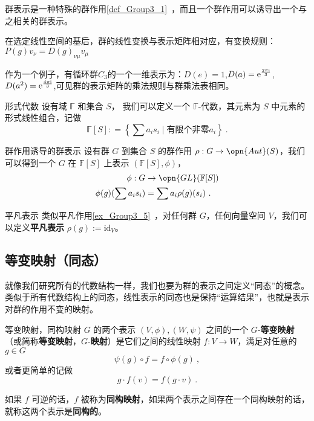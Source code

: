 群表示是一种特殊的群作用\autoref{def_Group3_1}~，而且一个群作用可以诱导出一个与之相关的群表示。

在选定线性空间的基后，群的线性变换与表示矩阵相对应，有变换规则：$P(g)v_\nu=D(g)_{\nu\mu}v_\mu$

作为一个例子，有循环群$C_3$的一个一维表示为：$D(e)=1$,$D(a)=\rm{e}^{\frac{2\pi i}{3}}$,$D(a^2)=\rm{e}^{\frac{4\pi i}{3}}$,可见群的表示矩阵的乘法规则与群乘法表相同。


\begin{definition}{形式代数}
设有域 $\mathbb{F}$ 和集合 $S$， 我们可以定义一个 $\mathbb{F}$-代数，其元素为 $S$ 中元素的形式线性组合，记做
$$
\mathbb{F}[S]: = \left\{ \sum a_i s_i \mid \text{有限个非零} a_i \right\}~.
$$
\end{definition}

\begin{definition}{群作用诱导的群表示}
设有群 $G$ 到集合 $S$ 的群作用 $\rho: G \to \opn{Aut}(S)$，我们可以得到一个 $G$ 在 $\mathbb{F}[S]$ 上表示 $(\mathbb{F}[S], \phi)$，
$$\begin{aligned}
\phi: G &\to \opn{GL}(\mathbb{F}[S]) \\
\phi(g)(\sum a_i s_i) &= \sum a_i \rho(g)(s_i)~.
\end{aligned}$$
\end{definition}

\begin{example}{平凡表示}
类似平凡作用\autoref{ex_Group3_5}~，对任何群 $G$，任何向量空间 $V$，我们可以定义\textbf{平凡表示} $\rho(g) := \text{id}_V$。
\end{example}



\subsection{等变映射（同态）}


就像我们研究所有的代数结构一样，我们也要为群的表示之间定义“同态”的概念。类似于所有代数结构上的同态，线性表示的同态也是保持“运算结果”，也就是表示对群的作用不变的映射。

\begin{definition}{等变映射，同构映射}\label{def_GrpRep_1}
$G$ 的两个表示 $(V, \phi), (W, \psi)$ 之间的一个 $G$-\textbf{等变映射}（或简称\textbf{等变映射}，$G$-\textbf{映射}）是它们之间的线性映射 $f: V \to W$，满足对任意的 $g \in G$
$$
\psi(g) \circ f = f \circ \phi(g)~,
$$
或者更简单的记做
$$
g \cdot f(v) = f(g \cdot v)~.
$$

如果 $f$ 可逆的话，$f$ 被称为\textbf{同构映射}，如果两个表示之间存在一个同构映射的话，就称这两个表示是\textbf{同构的}。
\end{definition}

